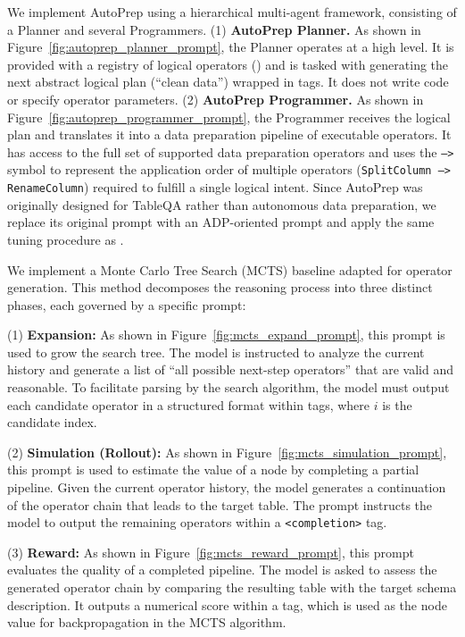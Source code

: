 We implement AutoPrep using a hierarchical multi-agent framework, consisting of a Planner and several Programmers.
(1) \textbf{AutoPrep Planner.} As shown in Figure~\ref{fig:autoprep_planner_prompt}, the Planner operates at a high level. It is provided with a registry of logical operators () and is tasked with generating the next abstract logical plan (\eg ``clean data'') wrapped in  tags. It does not write code or specify operator parameters.
(2) \textbf{AutoPrep Programmer.} As shown in Figure~\ref{fig:autoprep_programmer_prompt}, the Programmer receives the logical plan and translates it into a data preparation pipeline of executable operators. It has access to the full set of supported data preparation operators and uses the \texttt{-->} symbol to represent the application order of multiple operators (\eg \texttt{SplitColumn --> RenameColumn}) required to fulfill a single logical intent.
Since AutoPrep was originally designed for TableQA rather than autonomous data preparation, we replace its original prompt with an ADP-oriented prompt and apply the same tuning procedure as \sys.

We implement a Monte Carlo Tree Search (MCTS) baseline adapted for operator generation. This method decomposes the reasoning process into three distinct phases, each governed by a specific prompt:

(1) \textbf{Expansion:} As shown in Figure~\ref{fig:mcts_expand_prompt}, this prompt is used to grow the search tree. The model is instructed to analyze the current history and generate a list of ``all possible next-step operators'' that are valid and reasonable. To facilitate parsing by the search algorithm, the model must output each candidate operator in a structured format within  tags, where $i$ is the candidate index.

(2) \textbf{Simulation (Rollout):} As shown in Figure~\ref{fig:mcts_simulation_prompt}, this prompt is used to estimate the value of a node by completing a partial pipeline. Given the current operator history, the model generates a continuation of the operator chain that leads to the target table. The prompt instructs the model to output the remaining operators within a \texttt{<completion>} tag.

(3) \textbf{Reward:} As shown in Figure~\ref{fig:mcts_reward_prompt}, this prompt evaluates the quality of a completed pipeline. The model is asked to assess the generated operator chain by comparing the resulting table with the target schema description. It outputs a numerical score within a  tag, which is used as the node value for backpropagation in the MCTS algorithm.

